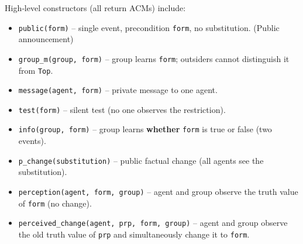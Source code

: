 High‑level constructors (all return ACMs) include:
\begin{itemize}
    \item \texttt{public(form)} – single event, 
    precondition \texttt{form}, no substitution. (Public announcement)
    \item \texttt{group\_m(group, form)} – group 
    learns \texttt{form}; outsiders cannot distinguish it from \texttt{Top}.
    \item \texttt{message(agent, form)} – private message to one agent.
    \item \texttt{test(form)} – silent test 
    (no one observes the restriction).
    \item \texttt{info(group, form)} – 
    group learns \textbf{whether} \texttt{form} is true or false (two events).
    \item \texttt{p\_change(substitution)} – public 
    factual change (all agents see the substitution).
    \item \texttt{perception(agent, form, group)} – 
    agent and group observe the truth value of \texttt{form} (no change).
    \item \texttt{perceived\_change(agent, prp, form, group)} – 
    agent and group observe the old truth value of 
    \texttt{prp} and simultaneously change it to \texttt{form}.
\end{itemize}

